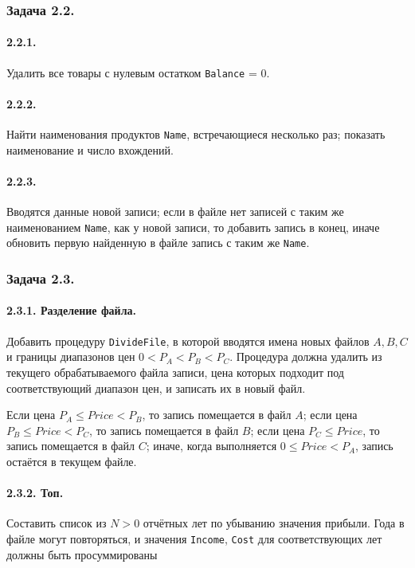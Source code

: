 \documentclass[12pt,a4paper]{report}
\begin{document}
\subsubsection*{Задача 2.2.}
\paragraph{2.2.1.} Удалить все товары с нулевым остатком \texttt{Balance} = 0.
\paragraph{2.2.2.} Найти наименования продуктов \texttt{Name}, встречающиеся несколько раз; показать наименование и число вхождений.
\paragraph{2.2.3.} Вводятся данные новой записи; если в файле нет записей с таким же наименованием \texttt{Name}, как у новой записи, то добавить запись в конец, иначе обновить первую найденную в файле запись с таким же \texttt{Name}.

\subsubsection*{Задача 2.3.}
\paragraph{2.3.1. Разделение файла.} Добавить процедуру \texttt{DivideFile}, в которой вводятся имена новых файлов $A, B, C$ и границы диапазонов цен $0 < P_A < P_B < P_C$. Процедура должна удалить из текущего обрабатываемого файла записи, цена которых подходит под соответствующий диапазон цен, и записать их в новый файл.

Если цена $P_A \le Price < P_B$, то запись помещается в файл $A$; если цена $P_B \le Price < P_C$, то запись помещается в файл $B$; если цена $P_C \le Price$, то запись помещается в файл $C$; иначе, когда выполняется $0 \le Price < P_A$, запись остаётся в текущем файле.

\paragraph{2.3.2. Топ.} Составить список из $N>0$ отчётных лет по убыванию значения прибыли. Года в файле могут повторяться, и значения \texttt{Income}, \texttt{Cost} для соответствующих лет должны быть просуммированы
\end{document}
